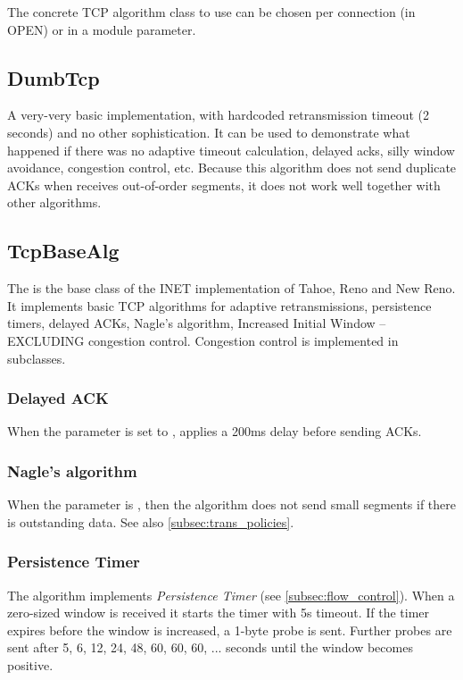 The concrete TCP algorithm class to use can be chosen per connection (in OPEN)
or in a module parameter.

\subsection{DumbTcp}

A very-very basic  implementation, with hardcoded
retransmission timeout (2 seconds) and no other sophistication. It can be
used to demonstrate what happened if there was no adaptive
timeout calculation, delayed acks, silly window avoidance,
congestion control, etc. Because this algorithm does not
send duplicate ACKs when receives out-of-order segments,
it does not work well together with other algorithms.

\subsection{TcpBaseAlg}

The  is the base class of the INET implementation
of Tahoe, Reno and New Reno. It implements basic TCP
algorithms for adaptive retransmissions, persistence timers,
delayed ACKs, Nagle's algorithm, Increased Initial Window
-- EXCLUDING congestion control. Congestion control
is implemented in subclasses.

\subsubsection*{Delayed ACK}

When the  parameter is set to ,
 applies a 200ms delay before sending ACKs.

\subsubsection*{Nagle's algorithm}

When the  parameter is , then
the algorithm does not send small segments if there is outstanding
data. See also \ref{subsec:trans_policies}.

\subsubsection*{Persistence Timer}

The algorithm implements \emph{Persistence Timer} (see \ref{subsec:flow_control}).
When a zero-sized window is received it starts the timer with 5s timeout.
If the timer expires before the window is increased, a 1-byte probe is
sent. Further probes are sent after 5, 6, 12, 24, 48, 60, 60, 60, ...
seconds until the window becomes positive.

